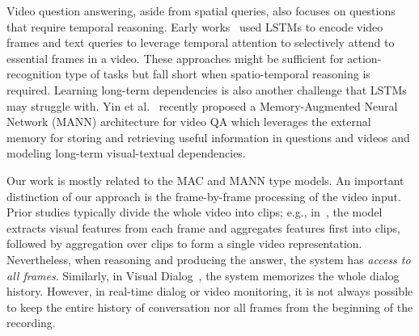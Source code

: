 Video question answering, aside from spatial queries, also focuses on questions that require temporal reasoning. Early works~\cite{mun2017marioqa, xu2017video, yu2017end} used LSTMs to encode video frames and text queries to leverage temporal attention to selectively attend to essential frames in a video. These approaches might be sufficient for action-recognition type of tasks but fall short when spatio-temporal reasoning is required. Learning long-term dependencies is also another challenge that LSTMs may struggle with. Yin et al.~\cite{yin2019memory} recently proposed a Memory-Augmented Neural Network (MANN) architecture for video QA which leverages the external memory for storing and retrieving useful information in questions and videos and modeling long-term visual-textual dependencies.

Our work is mostly related to the MAC and MANN type models. An important distinction of our approach is the frame-by-frame processing of the video input. Prior studies typically divide the whole video into clips; e.g., in~\cite{song2018explore}, the model extracts visual features from each frame and aggregates features first into clips, followed by aggregation over clips to form a single video representation. Nevertheless, when reasoning and producing the answer, the system has \emph{access to all frames}. Similarly, in Visual Dialog~\cite{das2017visual}, the system memorizes the whole dialog history. However, in real-time dialog or video monitoring, it is not always possible to keep the entire history of conversation nor all frames from the beginning of the recording.